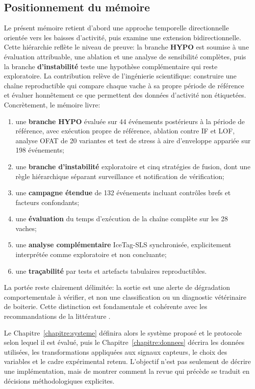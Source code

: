 \subsection{Positionnement du mémoire}
Le présent mémoire retient d'abord une approche temporelle directionnelle orientée vers les
baisses d'activité, puis examine une extension bidirectionnelle. Cette hiérarchie reflète le
niveau de preuve: la branche \textbf{HYPO} est soumise à une évaluation attribuable, une ablation et
une analyse de sensibilité complètes, puis la branche \textbf{d'instabilité} teste une
hypothèse complémentaire qui reste exploratoire. La contribution relève de l'ingénierie scientifique:
construire une chaîne reproductible qui compare chaque vache à sa propre période de référence et évaluer
honnêtement ce que permettent des données d'activité non étiquetées. Concrètement, le
mémoire livre:
\begin{enumerate}
  \item une \textbf{branche HYPO} évaluée sur 44 événements postérieurs à la période de référence, avec exécution propre de
  référence, ablation contre IF et LOF, analyse OFAT de 20 variantes et test de stress
  à aire d'enveloppe appariée sur 198 événements;
  \item une \textbf{branche d'instabilité} exploratoire et cinq stratégies de fusion, dont une règle
  hiérarchique séparant surveillance et notification de vérification;
  \item une \textbf{campagne étendue} de 132 événements incluant contrôles brefs et facteurs
  confondants;
  \item une \textbf{évaluation} du temps d'exécution de la chaîne complète sur les 28 vaches;
  \item une \textbf{analyse complémentaire} IceTag-SLS synchronisée, explicitement interprétée comme
  exploratoire et non concluante;
  \item une \textbf{traçabilité} par tests et artefacts tabulaires reproductibles.
\end{enumerate}

La portée reste clairement délimitée: la sortie est une alerte de dégradation
comportementale à vérifier, et non une classification ou un diagnostic vétérinaire de
boiterie. Cette distinction est fondamentale et cohérente avec les recommandations de la
littérature \citep{alsaaod2019automatic}.

Le Chapitre~\ref{chapitre:systeme} définira alors le système proposé et le protocole selon lequel
il est évalué, puis le Chapitre~\ref{chapitre:donnees} décrira les données utilisées, les
transformations appliquées aux signaux capteurs, le choix des variables et le cadre
expérimental retenu. L'objectif n'est pas seulement de décrire une implémentation, mais de
montrer comment la revue qui précède se traduit en décisions méthodologiques explicites.
